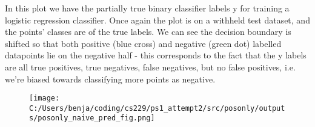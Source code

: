 



\begin{answer}
	In this plot we have the partially true binary classifier labels y for training a logistic regression classifier. Once again the plot is on a withheld test dataset, and the points' classes are of the true labels. We can see the decision boundary is shifted so that both positive (blue cross) and negative (green dot) labelled datapoints lie on the negative half - this corresponds to the fact that the y labels are all true positives, true negatives, false negatives, but no false positives, i.e. we're biased towards classifying more points as negative.
	\begin{figure}[H]
		\texttt{[image: C:/Users/benja/coding/cs229/ps1\_attempt2/src/posonly/outputs/posonly\_naive\_pred\_fig.png]}
	\end{figure}
	
\end{answer}
